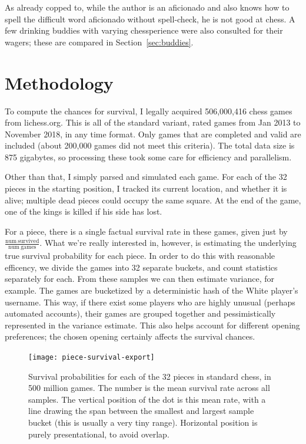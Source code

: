 \documentclass[twocolumn]{article}
\begin{document}
As already copped to, while the author is an aficionado and also knows
how to spell the difficult word aficionado without spell-check, he is
not good at chess. A few drinking buddies with varying chessperience
were also consulted for their wagers; these are compared in
Section~\ref{sec:buddies}.


\section{Methodology}

To compute the chances for survival, I legally acquired 506,000,416
chess games from lichess.org. This is all of the standard variant,
rated games from Jan 2013 to November 2018, in any time format. Only
games that are completed and valid are included (about 200,000 games
did not meet this criteria). The total data size is 875 gigabytes, so
processing these took some care for efficiency and parallelism.

Other than that, I simply parsed and simulated each game. For each
of the 32 pieces in the starting position, I tracked its current
location, and whether it is alive; multiple dead pieces could
occupy the same square. At the end of the game, one of the kings is
killed if his side has lost.

For a piece, there is a single factual survival rate in these games,
given just by $\frac{\mathrm{num~survived}}{\mathrm{num~games}}$. What
we're really interested in, however, is estimating the underlying true
survival probability for each piece. In order to do this with
reasonable efficency, we divide the games into 32 separate buckets,
and count statistics separately for each. From these samples we can
then estimate variance, for example. The games are bucketized by a
deterministic hash of the White player's username. This way, if there
exist some players who are highly unusual (perhaps automated
accounts), their games are grouped together and pessimistically
represented in the variance estimate. This also helps account for
different opening preferences; the chosen opening certainly affects
the survival chances.

\begin{figure}[htb]
  \begin{center}
    \texttt{[image: piece-survival-export]}
  \end{center}\vspace{-0.1in}
  \caption{Survival probabilities for each of the 32 pieces in standard
    chess, in 500 million games. The number is the mean survival rate
    across all samples. The vertical position of the dot is this mean
    rate, with a line drawing the span between the smallest and largest
    sample bucket (this is usually a very tiny range).
    Horizontal position is purely presentational, to avoid overlap.}
  \label{fig:piece-survival}
\end{figure}
\end{document}

